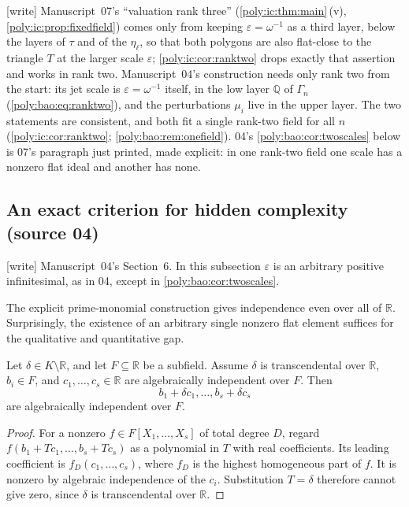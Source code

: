 \documentclass[11pt,a4paper]{article}
\numberwithin{equation}{section}
\theoremstyle{plain}
\newcommand{\wtag}{\textup{[write]}}%
\newcommand{\R}{\mathbb R}
\newcommand{\Q}{\mathbb Q}
\newcommand{\eps}{\varepsilon}
\begin{document}
\begin{remark}\label{poly:ic:rem:rankthree}
\wtag{} Manuscript~07's ``valuation rank three''
(\cref{poly:ic:thm:main}\,(v), \cref{poly:ic:prop:fixedfield}) comes only
from keeping $\eps=\omega^{-1}$ as a third layer, below the layers of
$\tau$ and of the $\eta_\ell$, so that both polygons are also flat-close to
the triangle $T$ at the larger scale $\eps$; \cref{poly:ic:cor:ranktwo}
drops exactly that assertion and works in rank two. Manuscript~04's
construction needs only rank two from the start: its jet scale is
$\eps=\omega^{-1}$ itself, in the low layer $\Q$ of $\Gamma_n$
(\eqref{poly:bao:eq:ranktwo}), and the perturbations $\mu_i$ live in the
upper layer. The two statements are consistent, and both fit a single
rank-two field for all $n$ (\cref{poly:ic:cor:ranktwo};
\cref{poly:bao:rem:onefield}). 04's \cref{poly:bao:cor:twoscales} below
is 07's paragraph just printed, made explicit: in one rank-two field one
scale has a nonzero flat ideal and another has none.
\end{remark}

\subsection{An exact criterion for hidden complexity (source 04)}\label{poly:bao:sec:criterion}
\wtag{} Manuscript~04's Section~6. In this subsection $\eps$ is an arbitrary
positive infinitesimal, as in 04, except in \cref{poly:bao:cor:twoscales}.

The explicit prime-monomial construction gives independence even over all
of $\R$. Surprisingly, the existence of an arbitrary single nonzero flat
element suffices for the qualitative and quantitative gap.

\begin{lemma}
\label{poly:bao:lem:oneparameter}
Let $\delta\in K\setminus\R$, and let $F\subseteq\R$ be a subfield.
Assume $\delta$ is transcendental over $\R$, $b_i\in F$, and
$c_1,\ldots,c_s\in\R$ are algebraically independent over $F$. Then
\[
 b_1+\delta c_1,\ldots,b_s+\delta c_s
\]
are algebraically independent over $F$.
\end{lemma}
\begin{proof}
For a nonzero $f\in F[X_1,\ldots,X_s]$ of total degree $D$, regard
$f(b_1+Tc_1,\ldots,b_s+Tc_s)$ as a polynomial in $T$ with real
coefficients. Its leading coefficient is $f_D(c_1,\ldots,c_s)$, where
$f_D$ is the highest homogeneous part of $f$. It is nonzero by algebraic
independence of the $c_i$. Substitution $T=\delta$ therefore cannot give
zero, since $\delta$ is transcendental over $\R$.
\end{proof}
\end{document}
